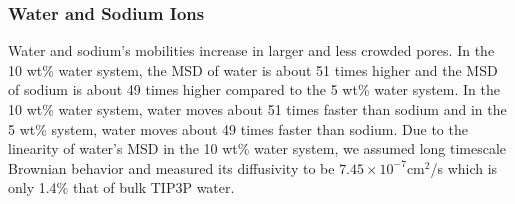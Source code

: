 \documentclass[journal=jpcbfk,manuscript=article]{achemso}
\begin{document}
  \subsubsection{Water and Sodium Ions}\label{section:transport_water_sodium} 

  Water and sodium's mobilities increase in larger and less crowded pores. 
  In the 10 wt\% water system, the MSD of water is about 51 times higher and
  the MSD of sodium is about 49 times higher compared to the 5 wt\% water system. 
  In the 10 wt\% water system, water moves about 51 times faster than sodium 
  and in the 5 wt\% system, water moves about 49 times faster than sodium. Due to
  the linearity of water's MSD in the 10 wt\% water system, we assumed
  long timescale Brownian behavior and measured its diffusivity to be 
  $7.45 \times 10^{-7}$cm$^2$/s which is only 1.4\% that of bulk TIP3P 
  water.~\cite{mahoney_diffusion_2000} %
  
\end{document}
